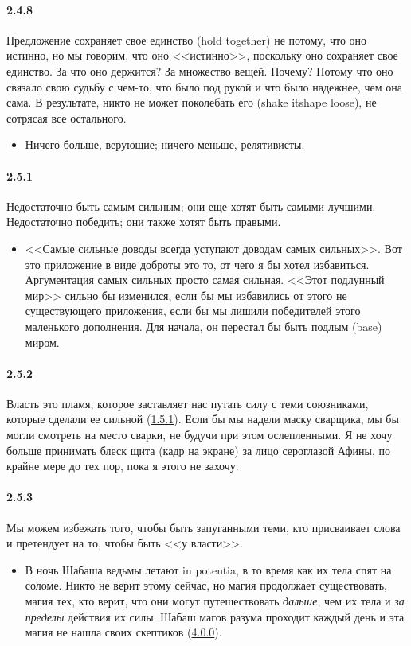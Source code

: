 \paragraph{2.4.8}\hypertarget{par:2.4.8}{} Предложение сохраняет свое единство (hold together) не потому, что оно истинно, но мы говорим, что оно <<истинно>>, поскольку оно сохраняет свое единство. За что оно держится? За множество вещей. Почему? Потому что оно связало свою судьбу с чем-то, что было под рукой и что было надежнее, чем она сама. В результате, никто не может поколебать его (shake itshape loose), не сотрясая все остального. 
	\begin{itemize}
	\item 
	Ничего больше, верующие; ничего меньше, релятивисты.
	\end{itemize}

\paragraph{2.5.1}\hypertarget{par:2.5.1}{} Недостаточно быть самым сильным; они еще хотят быть самыми лучшими. Недостаточно победить; они также хотят быть правыми. 
	\begin{itemize}
	\item 
	<<Самые сильные доводы всегда уступают доводам самых сильных>>. Вот это приложение в виде доброты это то, от чего я бы хотел избавиться. Аргументация самых сильных просто самая сильная. <<Этот подлунный мир>> сильно бы изменился, если бы мы избавились от этого не существующего приложения, если бы мы лишили победителей этого маленького дополнения. Для начала, он перестал бы быть подлым (base) миром.
	\end{itemize}

\paragraph{2.5.2}\hypertarget{par:2.5.2}{} Власть это пламя, которое заставляет нас путать силу с теми союзниками, которые сделали ее сильной (\hyperlink{par:1.5.1}{1.5.1}). Если бы мы надели маску сварщика, мы бы могли смотреть на место сварки, не будучи при этом ослепленными. Я не хочу больше принимать блеск щита (кадр на экране) за лицо сероглазой Афины, по крайне мере до тех пор, пока я этого не захочу.

\paragraph{2.5.3}\hypertarget{par:2.5.3}{} Мы можем избежать того, чтобы быть запуганными теми, кто присваивает слова и претендует на то, чтобы быть <<у власти>>. 
	\begin{itemize}
	\item 
	В ночь Шабаша ведьмы летают in potentia, в то время как их тела спят на соломе. Никто не верит этому сейчас, но магия продолжает существовать, магия тех, кто верит, что они могут путешествовать {\itshape дальше}, чем их тела и {\itshape за пределы} действия их силы. Шабаш магов разума проходит каждый день и эта магия не нашла своих скептиков (\hyperlink{par:4.0.0}{4.0.0}).
	\end{itemize}


